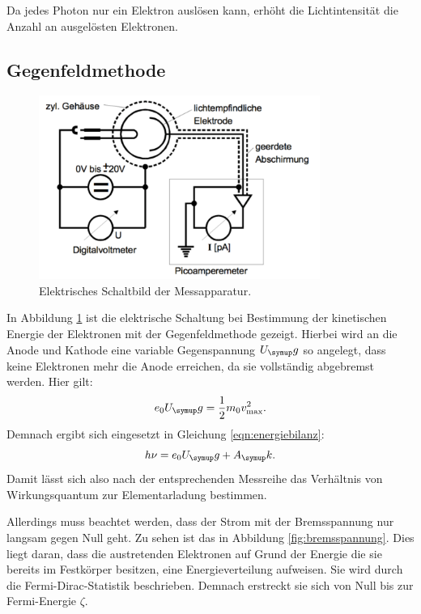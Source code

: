 Da jedes Photon nur ein Elektron auslösen kann, erhöht die Lichtintensität
die Anzahl an ausgelösten Elektronen.

\subsection{Gegenfeldmethode}
\label{sec:gegenfeld}

\begin{figure}[H]
  \centering
  \includegraphics[height = 6cm]{NacktbilderMilaKunis/elektrikaufbau.pdf}
  \caption{Elektrisches Schaltbild der Messapparatur\cite{anleitung}.}
  \label{fig:elektrikaufbau}
\end{figure}

In Abbildung \ref{fig:elektrikaufbau} ist die elektrische Schaltung bei Bestimmung
der kinetischen Energie der Elektronen mit der Gegenfeldmethode gezeigt.
Hierbei wird an die Anode und Kathode eine variable Gegenspannung $U_\g{g}$
so angelegt, dass keine Elektronen mehr die Anode erreichen, da sie vollständig
abgebremst werden.
Hier gilt:
\begin{equation}
  e_0 U_\g{g} = \frac{1}{2} m_0 v_\text{max}^2.
\end{equation}
Demnach ergibt sich eingesetzt in Gleichung \eqref{eqn:energiebilanz}:
\begin{equation}
  h \nu = e_0 U_\g{g} + A_\g{k}.
  \label{eqn:gegenfeld}
\end{equation}
Damit lässt sich also nach der entsprechenden Messreihe das Verhältnis von Wirkungsquantum
zur Elementarladung bestimmen.

Allerdings muss beachtet werden, dass der Strom mit der Bremsspannung nur
langsam gegen Null geht. Zu sehen ist das in Abbildung \ref{fig:bremsspannung}.
Dies liegt daran, dass die austretenden Elektronen auf Grund der Energie die
sie bereits im Festkörper besitzen, eine Energieverteilung aufweisen.
Sie wird durch die Fermi-Dirac-Statistik beschrieben.
Demnach erstreckt sie sich von Null bis zur Fermi-Energie $\zeta$.

